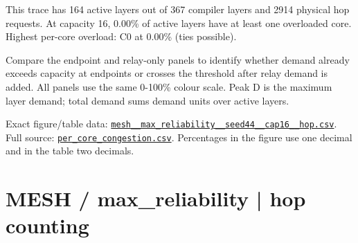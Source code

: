 \documentclass[10pt,a4paper]{article}
\begin{document}
This trace has 164 active layers out of 367 compiler layers and 2914 physical hop requests. At capacity 16, 0.00\% of active layers have at least one overloaded core. Highest per-core overload: C0 at 0.00\% (ties possible).\par
Compare the endpoint and relay-only panels to identify whether demand already exceeds capacity at endpoints or crosses the threshold after relay demand is added. All panels use the same 0-100\% colour scale. Peak D is the maximum layer demand; total demand sums demand units over active layers.\par
Exact figure/table data: \href{\detokenize{file:///home/dhruv-pansuriya/Documents/BTP/Compiler-Driven-ACE/output/pdf/qaoa_methods_congestion/tables/mesh__max_reliability__seed44__cap16__hop.csv}}{\nolinkurl{mesh__max_reliability__seed44__cap16__hop.csv}}. Full source: \href{\detokenize{file:///home/dhruv-pansuriya/Documents/BTP/Compiler-Driven-ACE/results/qaoa_2seed_2026-10-26/congestion/per_core_congestion.csv}}{\nolinkurl{per_core_congestion.csv}}. Percentages in the figure use one decimal and in the table two decimals.\par
\clearpage
\section*{MESH / max\_reliability | hop counting}
\end{document}
